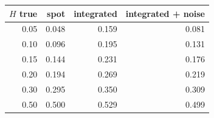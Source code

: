 \begin{tabular}{rrrr}
\toprule
$H$ true & spot & integrated & integrated + noise\\
\midrule
0.05 & 0.048 & 0.159 & 0.081\\
0.10 & 0.096 & 0.195 & 0.131\\
0.15 & 0.144 & 0.231 & 0.176\\
0.20 & 0.194 & 0.269 & 0.219\\
0.30 & 0.295 & 0.350 & 0.309\\
0.50 & 0.500 & 0.529 & 0.499\\
\bottomrule
\end{tabular}